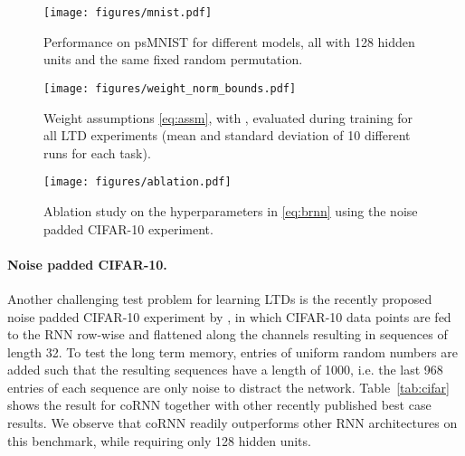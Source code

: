 \documentclass{article} \usepackage{iclr2021_conference,times}
\newcommand{\Tref}[1]{Table~\ref{#1}}
\begin{document}
\begin{figure}[ht!]
\centering
\begin{minipage}[t]{.32\textwidth}
\texttt{[image: figures/mnist.pdf]}
\caption{Performance on psMNIST for different models, all with 128 hidden units and the same fixed random permutation.}
\label{fig:mnist}
\end{minipage}\hspace{0.01\textwidth}
\begin{minipage}[t]{.32\textwidth}
\texttt{[image: figures/weight\_norm\_bounds.pdf]}
\caption{Weight assumptions \eqref{eq:assm}, with , evaluated during training for all LTD experiments (mean and standard deviation of 10 different runs for each task).}
\label{fig:weight_assumptions}
\end{minipage}\hspace{0.01\textwidth}
\begin{minipage}[t]{.32\textwidth}
\texttt{[image: figures/ablation.pdf]}
\caption{Ablation study on the hyperparameters  in \eqref{eq:brnn} using the noise padded CIFAR-10 experiment.}
\label{fig:ablation}
\end{minipage}
\end{figure}

\paragraph{Noise padded CIFAR-10.}
Another challenging test problem for learning LTDs is the recently proposed noise padded CIFAR-10 experiment by \cite{anti}, in which CIFAR-10 data points \citep{cifar} are fed to the RNN row-wise and flattened along the channels resulting in sequences of length 32. To test the long term memory, entries of uniform random numbers are added such that the resulting sequences have a length of 1000, i.e. the last 968 entries of each sequence are only noise to distract the network. 
\Tref{tab:cifar} shows the result for coRNN together with other recently published best case results. We observe that coRNN readily outperforms other RNN architectures on this benchmark, while requiring only 128 hidden units.
\end{document}
